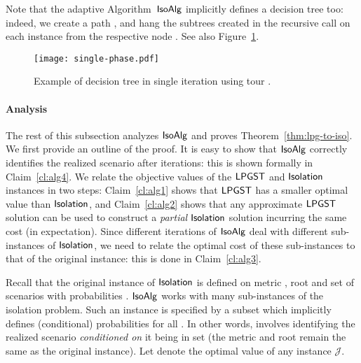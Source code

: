 \documentclass[11pt]{article}
\def\js{\ensuremath{\mathcal{J}}}
\def\iso{\ensuremath{{\sf IsoAlg}}\xspace}
\def\isoprob{\ensuremath{{\sf Isolation}}\xspace}
\def\lpgst{\ensuremath{{\sf LPGST}}\xspace}
\begin{document}
Note that the adaptive Algorithm~\iso implicitly defines a decision tree too: indeed, we create a path , and hang the subtrees created in the recursive call on each instance  from the respective node . See also Figure~\ref{fig:single-phase}.

\begin{figure}
\begin{center}
\texttt{[image: single-phase.pdf]}
 \end{center}
\caption{\label{fig:single-phase} Example of decision tree in  single iteration using tour .}
\end{figure}






\paragraph{Analysis} The rest of this subsection analyzes \iso and proves  Theorem~\ref{thm:lpg-to-iso}.  
We first provide an  outline of the proof. It is easy to show that \iso correctly identifies the realized
scenario after  iterations: this is shown formally in Claim~\ref{cl:alg4}. We relate the objective values of 
the \lpgst and \isoprob instances in two steps: Claim~\ref{cl:alg1} shows that \lpgst has a smaller optimal value than \isoprob,  
and Claim~\ref{cl:alg2} shows that any approximate \lpgst solution can be used to construct a {\em partial} \isoprob solution incurring the same cost (in expectation). Since different iterations of \iso deal with different sub-instances of \isoprob, we need to relate the optimal cost of these sub-instances to that of the original instance: this is done in Claim~\ref{cl:alg3}.




Recall that the original instance of \isoprob is defined on metric , root  and set  of scenarios with probabilities . \iso works with many sub-instances of the isolation problem. Such an instance  is specified by a subset  which implicitly defines (conditional) probabilities  for all . In other words,  involves identifying the realized scenario {\em conditioned on} it being in set  (the metric and root remain the same as the original instance). Let  denote the optimal value of any instance \js.
\end{document}
